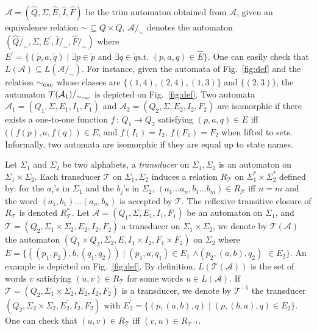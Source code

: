 \documentclass[]{llncs}
\def \A {\mathcal{A}}
\def \T {\mathcal{T}}
\begin{document}
                 $\hat{\A}=(\hat{Q},\Sigma,\hat{E},\hat{I},\hat{F})$
                 be the trim automaton obtained from $\A$, given an
                 equivalence relation $\sim \subseteq Q\times Q$,
                 $\A/_\sim$ denotes the automaton
                 $(\hat{Q}/_\sim,\Sigma,E^\prime,\hat{I}/_\sim,
                 \hat{F}/_\sim)$ where
                 $E^\prime=\{(\tilde{p},a,\tilde{q})\mid \exists p\in
                 \tilde{p}\text{ and } \exists q\in \tilde{q}\text{
                   s.t. } (p,a,q)\in \hat{E}\}$. One can easily check
                 that $L(\A)\subseteq L(\A/_\sim)$. For instance,
                 given the automata of Fig.~\ref{fig:def} and the
                 relation $\sim_{\rm exe}$ whose classes are $\{(1,4),
                 (2,4), (1,3)\}$ and $\{(2,3)\}$, the automaton
                 $\mathcal{T}(\A_1)/_{\sim_{\rm exe}}$ is depicted on
                 Fig.~\ref{fig:def}. Two automata
                 $\A_1=(Q_1,\Sigma,E_1,I_1,F_1)$ and
                 $\A_2=(Q_2,\Sigma,E_2,I_2,F_2)$ are isomorphic if
                 there exists a one-to-one function $f\,:\, Q_1
                 \rightarrow Q_2$ satisfying $(p,a,q)\in E$ iff
                 $((f(p),a,f(q))\in E$, and $f(I_1)=I_2$, $f(F_1)=F_2$
                 when lifted to sets. Informally, two automata are
                 isomorphic if they are equal up to state names.












Let $\Sigma_1$ and $\Sigma_2$ be two alphabets, a {\it
  transducer} on $\Sigma_1,\Sigma_2$ is an automaton on
$\Sigma_1\times\Sigma_2$. Each transducer $\T$ on $\Sigma_1,\Sigma_2$
induces a relation $R_\T$ on $\Sigma_1^*\times\Sigma_2^*$ defined by:
for the $a_i$'s in $\Sigma_1$ and the $b_j$'s in $\Sigma_2$,  
$(a_1\ldots a_n,b_1\ldots b_m)\in R_\T$ iff $n=m$ and the word
$(a_1,b_1)\ldots(a_n,b_n)$ is accepted by $\T$.
The reflexive transitive closure of $R_\T$ is denoted $R_\T^*$.
Let $\A=(Q_1,\Sigma,E_1,I_1,F_1)$ be an automaton on $\Sigma_1$, and 
$\T=(Q_2,\Sigma_1\times \Sigma_2,E_2,I_2,F_2)$ a transducer on
$\Sigma_1 \times \Sigma_2$, we denote by $\T(\A)$ the automaton $(Q_1\times
Q_2,\Sigma_2,E,I_1\times I_2,F_1\times F_2)$ on $\Sigma_2$ where
$E=\{((p_1,p_2),b,(q_1,q_2))\mid (p_1,a,q_1)\in E_1 $ $\wedge 
(p_2,(a,b),q_2)$ $\in E_2\}$. 
An example is depicted on Fig.~\ref{fig:def}.
By definition, $L(\T(\A))$ is the set of words
$v$ satisfying $(u,v)\in R_\T$ for some words $u\in L(\A)$. 
If $\T=(Q_2,\Sigma_1\times \Sigma_2,E_2,I_2,F_2)$ is a transducer, we denote
by $\T^{-1}$ the transducer $(Q_2,\Sigma_2\times \Sigma_2,E_2^\prime,I_2,F_2)$
with $E^\prime_2=\{(p,(a,b),q)\mid (p,(b,a),q)\in E_2\}$. One can check that
$(u,v)\in R_\T$ iff $(v,u)\in R_{\T^{-1}}$.
\end{document}
